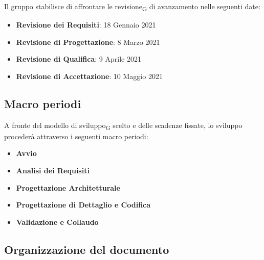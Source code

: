 Il gruppo stabilisce di affrontare le revisione\textsubscript{G} di avanzamento nelle seguenti date:
\begin{itemize}
	\item \textbf{Revisione dei Requisiti}: 18 Gennaio 2021
	\item \textbf{Revisione di Progettazione}: 8 Marzo 2021 
	\item \textbf{Revisione di Qualifica}: 9 Aprile 2021
	\item \textbf{Revisione di Accettazione}: 10 Maggio 2021	
\end{itemize}


\subsection{Macro periodi}

A fronte del modello di sviluppo\textsubscript{G} scelto e delle scadenze fissate, lo sviluppo procederà attraverso i seguenti macro periodi:
\begin{itemize}
	\item \textbf{Avvio}
	\item \textbf{Analisi dei Requisiti}
	\item \textbf{Progettazione Architetturale}
	\item \textbf{Progettazione di Dettaglio e Codifica}
	\item \textbf{Validazione e Collaudo}
\end{itemize}



\subsection{Organizzazione del documento}

